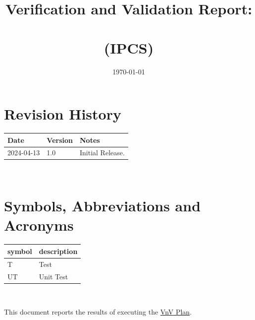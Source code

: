 \documentclass[12pt, titlepage]{article}
\begin{document}
\title{Verification and Validation Report:\\ \progname \\ (IPCS)}
\author{\authname}
\date{\today}

\maketitle


\section{Revision History}

\begin{tabularx}{\textwidth}{p{3cm}p{2cm}X}
  \toprule {\bf Date} & {\bf Version} & {\bf Notes}      \\
  \midrule
  2024-04-13          & 1.0           & Initial Release. \\
  \bottomrule
\end{tabularx}

~\newpage

\section{Symbols, Abbreviations and Acronyms}

\renewcommand{\arraystretch}{1.2}
\begin{tabular}{l l}
  \toprule
  \textbf{symbol} & \textbf{description} \\
  \midrule
  T               & Test                 \\
  UT              & Unit Test            \\
  \bottomrule
\end{tabular}\\


\newpage

\tableofcontents

\listoftables %

\listoffigures %

\newpage


This document reports the results of executing the
\href{https://github.com/mirzaim/ipcs/blob/main/docs/VnVPlan/VnVPlan.pdf}{VnV Plan}.
\end{document}
